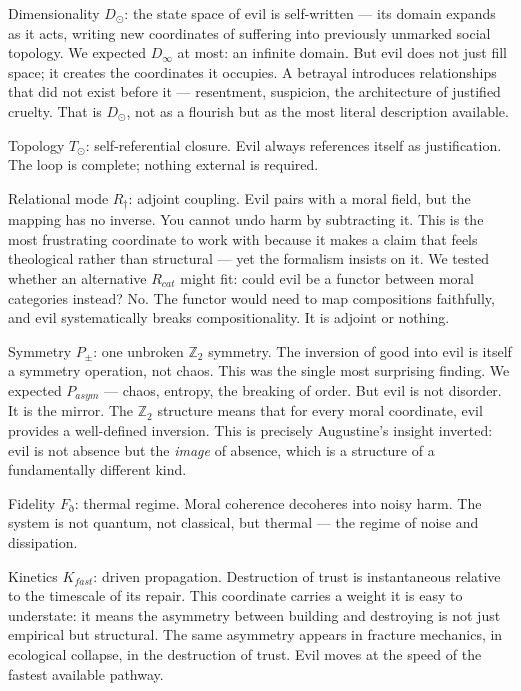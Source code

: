 \documentclass[12pt,a4paper]{article}
\begin{document}
Dimensionality $D_{\odot}$: the state space of evil is self-written --- its domain expands as it acts, writing new coordinates of suffering into previously unmarked social topology. We expected $D_{\infty}$ at most: an infinite domain. But evil does not just fill space; it creates the coordinates it occupies. A betrayal introduces relationships that did not exist before it --- resentment, suspicion, the architecture of justified cruelty. That is $D_{\odot}$, not as a flourish but as the most literal description available.

Topology $T_{\odot}$: self-referential closure. Evil always references itself as justification. The loop is complete; nothing external is required.

Relational mode $R_{\dagger}$: adjoint coupling. Evil pairs with a moral field, but the mapping has no inverse. You cannot undo harm by subtracting it. This is the most frustrating coordinate to work with because it makes a claim that feels theological rather than structural --- yet the formalism insists on it. We tested whether an alternative $R_{cat}$ might fit: could evil be a functor between moral categories instead? No. The functor would need to map compositions faithfully, and evil systematically breaks compositionality. It is adjoint or nothing.

Symmetry $P_{\pm}$: one unbroken $\mathbb{Z}_2$ symmetry. The inversion of good into evil is itself a symmetry operation, not chaos. This was the single most surprising finding. We expected $P_{asym}$ --- chaos, entropy, the breaking of order. But evil is not disorder. It is the mirror. The $\mathbb{Z}_2$ structure means that for every moral coordinate, evil provides a well-defined inversion. This is precisely Augustine's insight inverted: evil is not absence but the \emph{image} of absence, which is a structure of a fundamentally different kind.

Fidelity $F_{\eth}$: thermal regime. Moral coherence decoheres into noisy harm. The system is not quantum, not classical, but thermal --- the regime of noise and dissipation.

Kinetics $K_{fast}$: driven propagation. Destruction of trust is instantaneous relative to the timescale of its repair. This coordinate carries a weight it is easy to understate: it means the asymmetry between building and destroying is not just empirical but structural. The same asymmetry appears in fracture mechanics, in ecological collapse, in the destruction of trust. Evil moves at the speed of the fastest available pathway.
\end{document}
